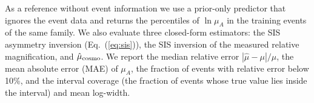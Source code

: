 As a reference without event information we use a prior-only predictor that ignores the event data and returns the percentiles of $\ln\mu_A$ in the training events of the same family. We also evaluate three closed-form estimators: the SIS asymmetry inversion (Eq.~(\ref{eq:sis})), the SIS inversion of the measured relative magnification, and $\hat\mu_{\rm cosmo}$. We report the median relative error $|\hat\mu-\mu|/\mu$, the mean absolute error (MAE) of $\mu_A$, the fraction of events with relative error below 10\%, and the interval coverage (the fraction of events whose true value lies inside the interval) and mean log-width.
